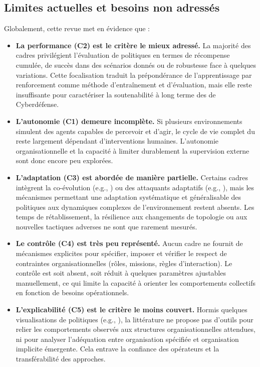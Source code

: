 \subsection{Limites actuelles et besoins non adressés}

Globalement, cette revue met en évidence que :
\begin{itemize}
  \item \textbf{La performance (C2) est le critère le mieux adressé.} La majorité des cadres privilégient l'évaluation de politiques en termes de récompense cumulée, de succès dans des scénarios donnés ou de robustesse face à quelques variations. Cette focalisation traduit la prépondérance de l'apprentissage par renforcement comme méthode d'entraînement et d'évaluation, mais elle reste insuffisante pour caractériser la soutenabilité à long terme des  de Cyberdéfense.

  \item \textbf{L'autonomie (C1) demeure incomplète.} Si plusieurs environnements simulent des agents capables de percevoir et d'agir, le cycle de vie complet du  reste largement dépendant d'interventions humaines. L'autonomie organisationnelle et la capacité à limiter durablement la supervision externe sont donc encore peu explorées.

  \item \textbf{L'adaptation (C3) est abordée de manière partielle.} Certains cadres intègrent la co-évolution (e.g., ) ou des attaquants adaptatifs (e.g., ), mais les mécanismes permettant une adaptation systématique et généralisable des politiques aux dynamiques complexes de l'environnement restent absents. Les temps de rétablissement, la résilience aux changements de topologie ou aux nouvelles tactiques adverses ne sont que rarement mesurés.

  \item \textbf{Le contrôle (C4) est très peu représenté.} Aucun cadre ne fournit de mécanismes explicites pour spécifier, imposer et vérifier le respect de contraintes organisationnelles (rôles, missions, règles d'interaction). Le contrôle est soit absent, soit réduit à quelques paramètres ajustables manuellement, ce qui limite la capacité à orienter les comportements collectifs en fonction de besoins opérationnels.

  \item \textbf{L'explicabilité (C5) est le critère le moins couvert.} Hormis quelques visualisations de politiques (e.g., ), la littérature ne propose pas d'outils pour relier les comportements observés aux structures organisationnelles attendues, ni pour analyser l'adéquation entre organisation spécifiée et organisation implicite émergente. Cela entrave la confiance des opérateurs et la transférabilité des approches.
\end{itemize}

